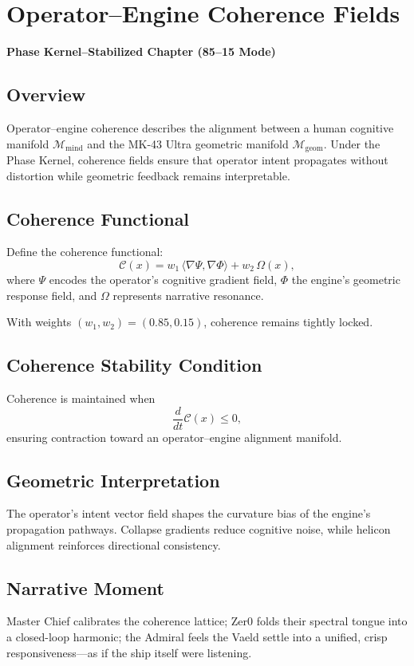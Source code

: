 
\chapter{Operator–Engine Coherence Fields}
\textbf{Phase Kernel–Stabilized Chapter (85--15 Mode)}

\section{Overview}
Operator–engine coherence describes the alignment between a human cognitive
manifold $\mathcal{M}_{\mathrm{mind}}$ and the MK-43 Ultra geometric manifold
$\mathcal{M}_{\mathrm{geom}}$. Under the Phase Kernel, coherence fields ensure
that operator intent propagates without distortion while geometric feedback
remains interpretable.

\section{Coherence Functional}
Define the coherence functional:
\[
\mathcal{C}(x) = w_1\,\langle \nabla \Psi, \nabla \Phi \rangle 
               + w_2\,\Omega(x),
\]
where $\Psi$ encodes the operator's cognitive gradient field, $\Phi$ the 
engine's geometric response field, and $\Omega$ represents narrative 
resonance.

With weights $(w_1,w_2) = (0.85, 0.15)$, coherence remains tightly locked.

\section{Coherence Stability Condition}
Coherence is maintained when
\[
\frac{d}{dt}\mathcal{C}(x) \le 0,
\]
ensuring contraction toward an operator–engine alignment manifold.

\section{Geometric Interpretation}
The operator's intent vector field shapes the curvature bias of the engine's
propagation pathways. Collapse gradients reduce cognitive noise, while 
helicon alignment reinforces directional consistency.

\section{Narrative Moment}
Master Chief calibrates the coherence lattice; Zer0 folds their spectral tongue
into a closed-loop harmonic; the Admiral feels the Vaeld settle into a unified,
crisp responsiveness—as if the ship itself were listening.
